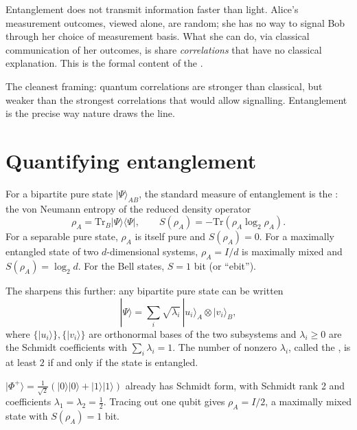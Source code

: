 Entanglement does not transmit information faster than light. Alice's measurement outcomes, viewed alone, are random; she has no way to signal Bob through her choice of measurement basis. What she can do, via classical communication of her outcomes, is share \emph{correlations} that have no classical explanation. This is the formal content of the .

\begin{remark}
The cleanest framing: quantum correlations are stronger than classical, but weaker than the strongest correlations that would allow signalling. Entanglement is the precise way nature draws the line.
\end{remark}

\section{Quantifying entanglement}

For a bipartite pure state $|\Psi\rangle_{AB}$, the standard measure of entanglement is the : the von Neumann entropy of the reduced density operator
\[
  \rho_A = \mathrm{Tr}_B|\Psi\rangle\langle\Psi|, \qquad
  S(\rho_A) = -\mathrm{Tr}(\rho_A \log_2 \rho_A).
\]
For a separable pure state, $\rho_A$ is itself pure and $S(\rho_A) = 0$. For a maximally entangled state of two $d$-dimensional systems, $\rho_A = I/d$ is maximally mixed and $S(\rho_A) = \log_2 d$. For the Bell states, $S = 1$ bit (or ``ebit'').

The  sharpens this further: any bipartite pure state can be written
\[
  |\Psi\rangle = \sum_i \sqrt{\lambda_i}\,|u_i\rangle_A \otimes |v_i\rangle_B,
\]
where $\{|u_i\rangle\}, \{|v_i\rangle\}$ are orthonormal bases of the two subsystems and $\lambda_i \geq 0$ are the Schmidt coefficients with $\sum_i \lambda_i = 1$. The number of nonzero $\lambda_i$, called the , is at least $2$ if and only if the state is entangled.

\begin{example}
$|\Phi^+\rangle = \tfrac{1}{\sqrt 2}(|0\rangle|0\rangle + |1\rangle|1\rangle)$ already has Schmidt form, with Schmidt rank 2 and coefficients $\lambda_1 = \lambda_2 = \tfrac12$. Tracing out one qubit gives $\rho_A = I/2$, a maximally mixed state with $S(\rho_A) = 1$ bit.
\end{example}

